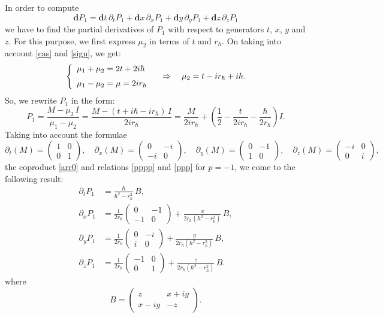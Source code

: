 \documentclass[10pt,a4paper]{amsart}
\newcommand{\pa}{\partial}
\newcommand{\hh}{\hbar}
\newcommand{\rh}{r_{\hbar}}
\newcommand{\dd}{\mathbf{d}}
\numberwithin{equation}{section}
\begin{document}
In order to compute
\[
\dd P_1=\dd t \,\partial_tP_1 +\dd x \,\partial_xP_1 +\dd y \,\partial_yP_1 + \dd z \,\partial_zP_1
\]
we have to find the partial derivatives of $P_1$ with respect to generators $t$, $x$, $y$ and $z$. For this purpose,
we first express $\mu_2$ in terms of $t$ and $\rh$. On taking into account \eqref{cas} and \eqref{sign}, we get:
\[
\left\{
\begin{array}{l}
\mu_1+\mu_2=2t+2i\hh\\
\rule{0pt}{5mm}
\mu_1-\mu_2=\mu=2i \rh
\end{array}
\right.\quad \Rightarrow\quad
\mu_2=t - i\rh +i\hh.
\]
So, we rewrite $P_1$ in the form:
\[
P_1=\frac{M-\mu_2\,I}{\mu_1-\mu_2}=\frac{M-(t+i\hh-i\rh)\,I}{2i\rh} = \frac{M}{2i\rh}+\left(\frac{1}{2}-\frac{t}{2i\rh}-\frac{\hh}{2\rh}\right) I.
\]
Taking into account the formulae
\[
\pa_t(M)=\left(\!\!\begin{array}{cc}
	1& 0\\
	0& 1
\end{array}\!\!\right),\quad \pa_x(M)=\left(\!\!\begin{array}{cc}
	0& -i\\
	-i& 0
\end{array}\!\!\right),\quad \pa_y(M)=\left(\!\!\begin{array}{cc}
	0& -1\\
	1& 0
\end{array}\!\!\right),\quad \pa_z(M)=\left(\!\!\begin{array}{cc}
	-i& 0\\
	0& i
\end{array}\!\!\right),
\]
the coproduct \eqref{arr0} and relations \eqref{pppp} and \eqref{ppp} for $p=-1$, we come to the following result:
\begin{align*}
\pa_tP_1&=\frac{\hh}{\hh^2-\rh^2}\,B,\\
\pa_xP_1&=\frac{1}{2\rh}
\begin{pmatrix}0&-1\\-1&0\end{pmatrix}
+\frac{x}{2\rh(\hh^2-\rh^2)}\,B,\\
\pa_yP_1&=\frac{1}{2\rh}
\begin{pmatrix}0&-i\\ i&0\end{pmatrix}
+\frac{y}{2\rh(\hh^2-\rh^2)}\,B,\\
\pa_zP_1&=\frac{1}{2\rh}
\begin{pmatrix}-1&0\\0&1\end{pmatrix}
+\frac{z}{2\rh(\hh^2-\rh^2)}\,B.
\end{align*}
where
\[
B=\left(\!\!\begin{array}{cc}
		z&x+i y\\
		x-i y&-z
	\end{array}\!\!\right).
\]
\end{document}
